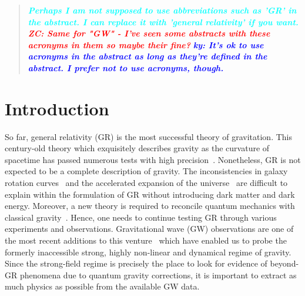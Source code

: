 \documentclass[prd,twocolumn,nofootinbib]{revtex4-1}
\newcommand{\ky}[1]{\textcolor{blue}{\it{\textbf{ky: #1}}} }
\newcommand{\st}[1]{\textcolor{cyan}{\it{\textbf{ #1}}} }
\newcommand{\zc}[1]{\textcolor{red}{\it{\textbf{ZC: #1}}} }
\begin{document}
\begin{abstract}
\st{Perhaps I am not supposed to use abbreviations such as 'GR' in the abstract. I can replace it with 'general relativity' if you want.}\zc{Same for "GW" - I've seen some abstracts with these acronyms in them so maybe their fine?}
\ky{It's ok to use acronyms in the abstract as long as they're defined in the abstract. I prefer not to use acronyms, though.}


\end{abstract}

\date{\today}




\maketitle




\section{Introduction}
So far, general relativity (GR) is the most successful theory of gravitation. This century-old theory which exquisitely describes gravity as the curvature of spacetime has passed numerous tests with high precision~\cite{Will:2014kxa}. Nonetheless, GR is not expected to be a complete description of gravity. The inconsistencies in  galaxy rotation curves~\cite{article,Bosma:1981zz,Begeman:1991iy,Rubin:1970zza,Rubin:1980zd,1973ApJ...186..467O,Ostriker:1993fr} and the accelerated expansion of the universe~\cite{Abbott:1988nx,Copeland:2006wr,Perlmutter:1998np,Riess:1998cb,Riess:2004nr,RevModPhys.61.1,vanAlbada:1984js,WEINBERG201387}  are difficult to explain within the formulation of GR without introducing dark matter and dark energy. Moreover, a new theory is required to reconcile quantum mechanics with classical gravity~\cite{Adler:2010wf,Ng:2003jk}. Hence, one needs to continue testing GR through various experiments and observations. Gravitational wave (GW) observations are one of the most recent additions to this venture~\cite{TheLIGOScientific:2016src,Yunes:2016jcc,LIGOScientific:2019fpa,Monitor:2017mdv,Abbott:2018lct} which have enabled us to probe the formerly inaccessible strong, highly non-linear and dynamical regime of gravity. Since the strong-field regime is precisely the place to look for evidence of beyond-GR phenomena due to quantum gravity corrections, it is important to extract as much physics as possible from the available GW data. 
\end{document}
